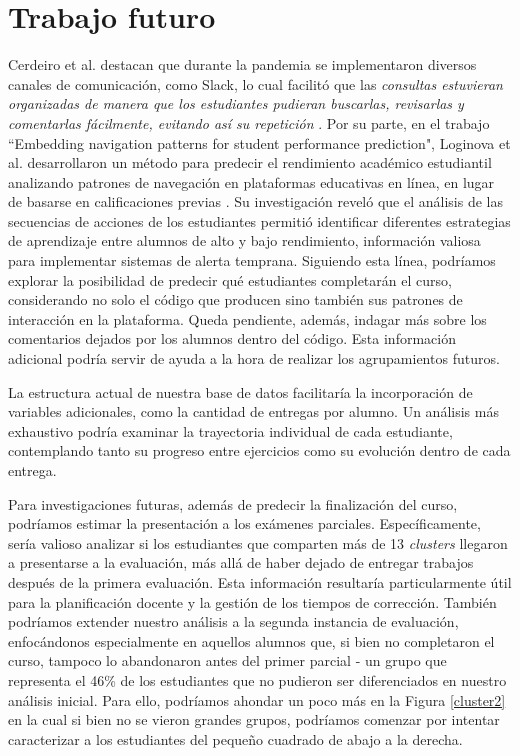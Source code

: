 \documentclass[11pt,a4paper,twoside,openany]{tesis}
\begin{document}
\chapter{Trabajo futuro }

Cerdeiro et al. destacan que durante la pandemia se implementaron diversos canales de comunicación, como Slack, lo cual facilitó que las \emph{consultas estuvieran organizadas de manera que los estudiantes pudieran buscarlas, revisarlas y comentarlas fácilmente, evitando así su repetición} \cite{unsam2020}. Por su parte, en el trabajo ``Embedding navigation patterns for student performance prediction", Loginova et al. desarrollaron un método para predecir el rendimiento académico estudiantil analizando patrones de navegación en plataformas educativas en línea, en lugar de basarse en calificaciones previas \cite{loginova2021embedding}. Su investigación reveló que el análisis de las secuencias de acciones de los estudiantes permitió identificar diferentes estrategias de aprendizaje entre alumnos de alto y bajo rendimiento, información valiosa para implementar sistemas de alerta temprana. Siguiendo esta línea, podríamos explorar la posibilidad de predecir qué estudiantes completarán el curso, considerando no solo el código que producen sino también sus patrones de interacción en la plataforma. Queda pendiente, además, indagar más sobre los comentarios dejados por los alumnos dentro del código. Esta información adicional podría servir de ayuda a la hora de realizar los agrupamientos futuros.

La estructura actual de nuestra base de datos facilitaría la incorporación de variables adicionales, como la cantidad de entregas por alumno. Un análisis más exhaustivo podría examinar la trayectoria individual de cada estudiante, contemplando tanto su progreso entre ejercicios como su evolución dentro de cada entrega.

Para investigaciones futuras, además de predecir la finalización del curso, podríamos estimar la presentación a los exámenes parciales. Específicamente, sería valioso analizar si los estudiantes que comparten más de 13 \emph{clusters} llegaron a presentarse a la evaluación, más allá de haber dejado de entregar trabajos después de la primera evaluación. Esta información resultaría particularmente útil para la planificación docente y la gestión de los tiempos de corrección. También podríamos extender nuestro análisis a la segunda instancia de evaluación, enfocándonos especialmente en aquellos alumnos que, si bien no completaron el curso, tampoco lo abandonaron antes del primer parcial - un grupo que representa el 46\% de los estudiantes que no pudieron ser diferenciados en nuestro análisis inicial. Para ello, podríamos ahondar un poco más en la Figura \ref{cluster2} en la cual si bien no se vieron grandes grupos, podríamos comenzar por intentar caracterizar a los estudiantes del pequeño cuadrado de abajo a la derecha. 
\backmatter


\end{document}
